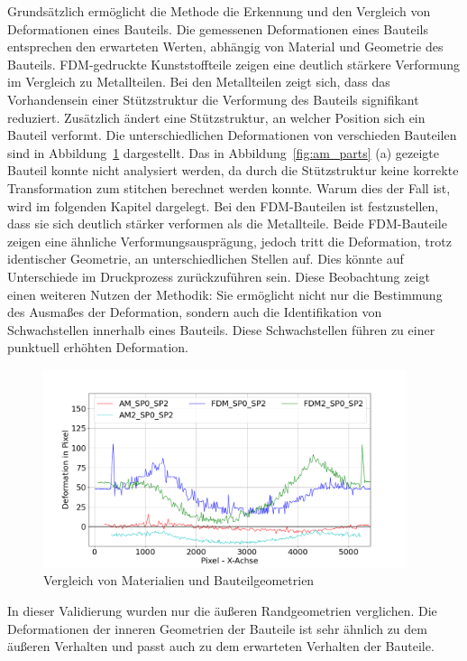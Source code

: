Grundsätzlich ermöglicht die Methode die Erkennung und den Vergleich von Deformationen 
eines Bauteils. Die gemessenen Deformationen eines Bauteils entsprechen den erwarteten Werten, 
abhängig von Material und Geometrie des Bauteils. FDM-gedruckte Kunststoffteile zeigen 
eine deutlich stärkere Verformung im Vergleich zu Metallteilen.
Bei den Metallteilen zeigt sich, dass das Vorhandensein einer Stützstruktur die
Verformung des Bauteils signifikant reduziert. Zusätzlich ändert eine Stützstruktur, an 
welcher Position sich ein Bauteil verformt.
Die unterschiedlichen Deformationen von verschieden Bauteilen sind in 
Abbildung~\ref{fig:materials} dargestellt. 
Das in Abbildung~\ref{fig:am_parts} (a) gezeigte Bauteil konnte nicht analysiert werden, 
da durch die Stützstruktur keine korrekte Transformation zum stitchen berechnet werden konnte.
Warum dies der Fall ist, wird im folgenden Kapitel dargelegt.
Bei den FDM-Bauteilen ist festzustellen, dass sie sich deutlich stärker verformen 
als die Metallteile. Beide FDM-Bauteile zeigen eine ähnliche Verformungsausprägung, 
jedoch tritt die Deformation, trotz identischer Geometrie, an unterschiedlichen Stellen auf. 
Dies könnte auf Unterschiede im Druckprozess zurückzuführen sein. 
Diese Beobachtung zeigt einen weiteren Nutzen der Methodik: Sie ermöglicht
nicht nur die Bestimmung des Ausmaßes der Deformation, sondern auch die 
Identifikation von Schwachstellen innerhalb eines Bauteils.
Diese Schwachstellen führen zu einer punktuell erhöhten Deformation.

\begin{figure}[H]
  \centering
  \includegraphics[width=0.95\textwidth]{images/compare_materials.png}
  \caption{Vergleich von Materialien und Bauteilgeometrien}
  \label{fig:materials}
\end{figure}

In dieser Validierung wurden nur 
die äußeren Randgeometrien verglichen. Die Deformationen der inneren 
Geometrien der Bauteile ist sehr ähnlich zu dem äußeren Verhalten und passt 
auch zu dem erwarteten Verhalten der Bauteile.

